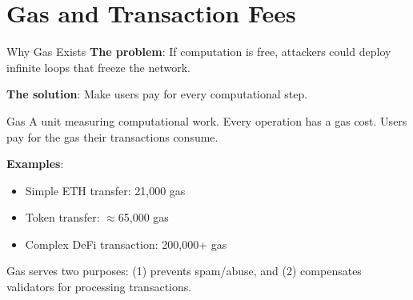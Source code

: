 \documentclass[10pt]{beamer}
\begin{document}
\section{Gas and Transaction Fees}

\begin{frame}{Why Gas Exists}
  \textbf{The problem}: If computation is free, attackers could deploy infinite loops that freeze the network.
  
  \vspace{1em}
  \textbf{The solution}: Make users pay for every computational step.
  
  \vspace{1em}
  \begin{block}{Gas}
    A unit measuring computational work. Every operation has a gas cost. Users pay for the gas their transactions consume.
  \end{block}
  
  \vspace{0.5em}
  \textbf{Examples}:
  \begin{itemize}
    \item Simple ETH transfer: 21,000 gas
    \item Token transfer: $\approx$65,000 gas
    \item Complex DeFi transaction: 200,000+ gas
  \end{itemize}
  
  \vspace{1em}
  Gas serves two purposes: (1) prevents spam/abuse, and (2) compensates validators for processing transactions.
\end{frame}
\end{document}
